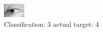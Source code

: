 \begin{figure}[h!]
\begin{center}
\includegraphics[width=0.60\columnwidth]{figures/ID3046_class_3_target_4.png}
\end{center}
\caption{ Classification: 3 actual target: 4}
\label{fig:ID3046_class_3_target_4}
\end{figure}
